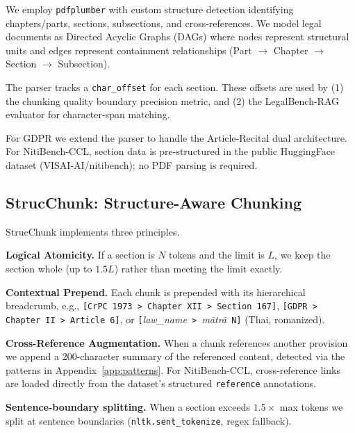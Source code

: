 \documentclass[sn-mathphys,Numbered]{sn-jnl}%
\begin{document}
We employ \texttt{pdfplumber} with custom structure detection identifying
chapters/parts, sections, subsections, and cross-references.  We model
legal documents as Directed Acyclic Graphs (DAGs) where nodes
represent structural units and edges represent containment relationships
(Part $\to$ Chapter $\to$ Section $\to$ Subsection).

The parser tracks a \texttt{char\_offset} for each section.  These offsets
are used by (1) the chunking quality boundary precision metric, and (2) the
LegalBench-RAG evaluator for character-span matching.

For GDPR we extend the parser to handle the Article-Recital dual
architecture.  For NitiBench-CCL, section data is pre-structured in the
public HuggingFace dataset (VISAI-AI/nitibench); no PDF parsing is required.

\subsection{StrucChunk: Structure-Aware Chunking}

StrucChunk implements three principles.

\textbf{Logical Atomicity.}  If a section is $N$ tokens and the limit is
$L$, we keep the section whole (up to $1.5L$) rather than meeting the
limit exactly.

\textbf{Contextual Prepend.}  Each chunk is prepended with its
hierarchical breadcrumb, e.g.,
\texttt{[CrPC 1973 > Chapter XII > Section 167]},
\texttt{[GDPR > Chapter II > Article 6]}, or
\texttt{[}\textit{law\_name}\texttt{ > }\textit{m\=atr\=a}\texttt{ N]}
(Thai, romanized).

\textbf{Cross-Reference Augmentation.}  When a chunk references another
provision we append a 200-character summary of the referenced content,
detected via the patterns in Appendix~\ref{app:patterns}.  For NitiBench-CCL,
cross-reference links are loaded directly from the dataset's structured
\texttt{reference} annotations.

\textbf{Sentence-boundary splitting.}  When a section exceeds $1.5\times$
max tokens we split at sentence boundaries (\texttt{nltk.sent\_tokenize},
regex fallback).

\end{document}
